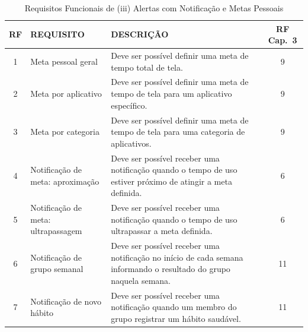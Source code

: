 \begin{table}[H]
\centering
\caption{Requisitos Funcionais de (iii) Alertas com Notificação e Metas Pessoais}
\begin{tabularx}{\textwidth}{|c|l|X|c|}
\hline
\rowcolor{verdeclaro}
\textbf{RF} & \textbf{REQUISITO} & \textbf{DESCRIÇÃO} & \textbf{RF Cap.~3} \\ \hline

1 & Meta pessoal geral &
Deve ser possível definir uma meta de tempo total de tela. & 9 \\ \hline

2 & Meta por aplicativo &
Deve ser possível definir uma meta de tempo de tela para um aplicativo específico. & 9 \\ \hline

3 & Meta por categoria &
Deve ser possível definir uma meta de tempo de tela para uma categoria de aplicativos. & 9 \\ \hline

4 & Notificação de meta: aproximação &
Deve ser possível receber uma notificação quando o tempo de uso estiver próximo de atingir a meta definida. & 6 \\ \hline

5 & Notificação de meta: ultrapassagem &
Deve ser possível receber uma notificação quando o tempo de uso ultrapassar a meta definida. & 6 \\ \hline

6 & Notificação de grupo semanal &
Deve ser possível receber uma notificação no início de cada semana informando o resultado do grupo naquela semana. & 11 \\ \hline

7 & Notificação de novo hábito &
Deve ser possível receber uma notificação quando um membro do grupo registrar um hábito saudável. & 11 \\ \hline

\end{tabularx}
\end{table}


